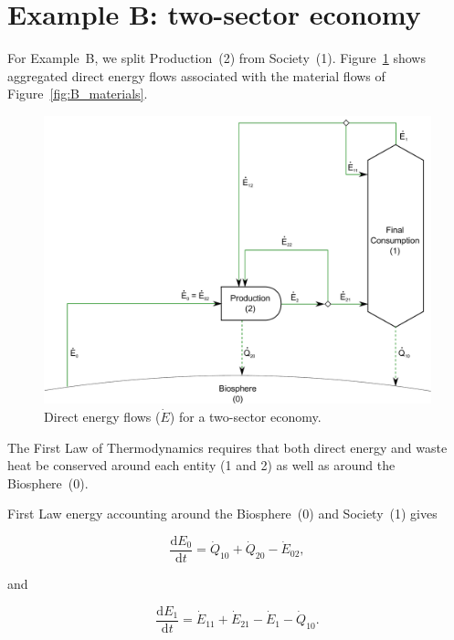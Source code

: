 \section{Example B: two-sector economy} %
\label{sec:B_energy}

For Example~B, we split Production~(2) from 
Society~(1). Figure~\ref{fig:B_energy} shows aggregated
direct energy flows associated with the material flows of Figure~\ref{fig:B_materials}.

\begin{figure}[!ht]
\centering
\includegraphics[width=0.8\linewidth]{Part_1/Chapter_Energy/images/2_sector_direct_energy.pdf}
\caption[Direct energy flows for a two-sector economy]{Direct energy flows ($\dot{E}$) for a two-sector economy.}
\label{fig:B_energy}
\end{figure}

The First Law of Thermodynamics
requires that both 
direct energy and 
waste heat
be conserved around each 
entity (1 and 2) as well as around the Biosphere~(0).

\noindent{}First Law energy accounting around the Biosphere~(0) and Society~(1) gives

\begin{equation} \label{eq:CV_E_dot_0}
	\frac{\mathrm{d}E_{0}}{\mathrm{d}t} 	 
	= \dot{Q}_{10} 
	+ \dot{Q}_{20} 
	- \dot{E}_{02},
\end{equation}

\noindent and 

\begin{equation} \label{eq:CV_E_dot_1}
	\frac{\mathrm{d}E_{1}}{\mathrm{d}t} 	 
	= \dot{E}_{11} 
	+ \dot{E}_{21}
	- \dot{E}_{1}
	- \dot{Q}_{10}.
\end{equation}

